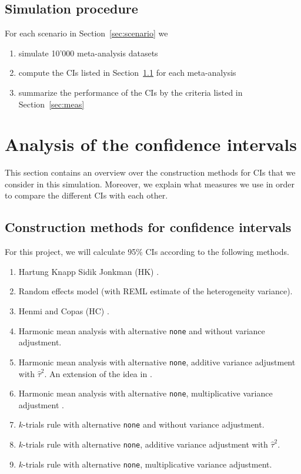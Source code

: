\documentclass[letterpaper, 9pt]{article}
\begin{document}
\subsection{Simulation procedure}
For each scenario in Section~\ref{sec:scenario} we
\begin{enumerate}
\item simulate 10'000 meta-analysis datasets
\item compute the CIs listed in Section~\ref{sec:method} for each meta-analysis
\item summarize the performance of the CIs by the criteria listed in Section~\ref{sec:meas}
\end{enumerate}

\section{Analysis of the confidence intervals}

This section contains an overview over the construction methods for CIs that we consider in this simulation. Moreover, we explain what measures we use in order to compare the different CIs with each other.

\subsection{Construction methods for confidence intervals} \label{sec:method}

For this project, we will calculate 95\% CIs according to the following methods.

\begin{enumerate}
\item Hartung Knapp Sidik Jonkman (HK) \citep{IntHoutIoannidis}. %
\item Random effects model (with REML estimate of the heterogeneity variance). %
\item Henmi and Copas (HC) \citep{henm:copa:10}. %
\item Harmonic mean analysis with alternative \texttt{none} \citep{Held2020b} and without variance adjustment. %
\item Harmonic mean analysis with alternative \texttt{none}, additive variance adjustment with $\hat \tau^2$. An extension of the idea in \citet{Held2020b}. 
\item Harmonic mean analysis with alternative \texttt{none}, multiplicative variance adjustment \citep{mawd:etal:17}.
\item $k$-trials rule with alternative \texttt{none} and without variance adjustment.
\item $k$-trials rule with alternative \texttt{none}, additive variance adjustment with $\hat \tau^2$. 
\item $k$-trials rule with alternative \texttt{none}, multiplicative variance adjustment.
\end{enumerate}
\end{document}
